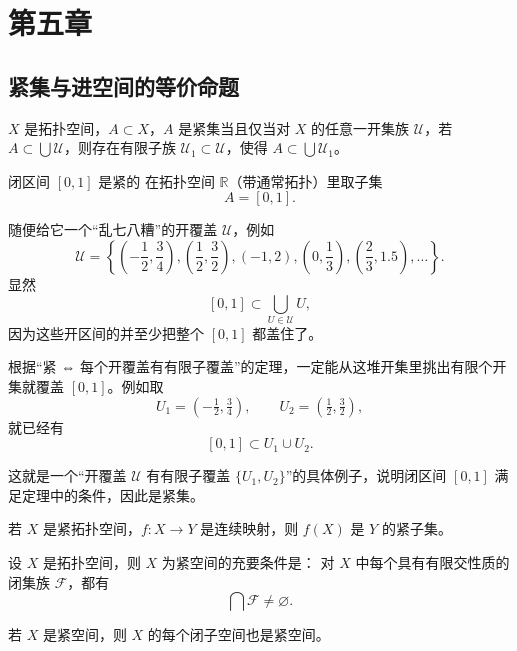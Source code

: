 \chapter{第五章}
\section{紧集与进空间的等价命题}
\begin{theorem}
$X$ 是拓扑空间，$A\subset X$，$A$ 是紧集当且仅当对 $X$ 的任意一开集族 $\mathcal{U}$，若 $A\subset\bigcup\mathcal{U}$，则存在有限子族 $\mathcal{U}_1\subset\mathcal{U}$，使得 $A\subset\bigcup\mathcal{U}_1$。
\end{theorem}
\begin{example}闭区间 $[0,1]$ 是紧的
在拓扑空间 $\mathbb{R}$（带通常拓扑）里取子集
\[
A=[0,1].
\]

随便给它一个“乱七八糟”的开覆盖 $\mathcal U$，例如
\[
\mathcal U=
\left\{
\left(-\frac12,\frac34\right),
\left(\frac12,\frac32\right),
\left(-1,2\right),
\left(0,\frac13\right),
\left(\frac23,1.5\right),
\ldots
\right\}.
\]
显然
\[
[0,1]\subset \bigcup_{U\in\mathcal U} U,
\]
因为这些开区间的并至少把整个 $[0,1]$ 都盖住了。

根据“紧 ⇔ 每个开覆盖有有限子覆盖”的定理，一定能从这堆开集里挑出有限个开集就覆盖 $[0,1]$。例如取
\[
U_1=\left(-\tfrac12,\tfrac34\right),\qquad
U_2=\left(\tfrac12,\tfrac32\right),
\]
就已经有
\[
[0,1]\subset U_1\cup U_2.
\]

这就是一个“开覆盖 $\mathcal U$ 有有限子覆盖 $\{U_1,U_2\}$”的具体例子，说明闭区间 $[0,1]$ 满足定理中的条件，因此是紧集。
\end{example}
\begin{theorem}
若 $X$ 是紧拓扑空间，$f:X\to Y$ 是连续映射，则 $f(X)$ 是 $Y$ 的紧子集。
\end{theorem}
\begin{theorem}
设 $X$ 是拓扑空间，则 $X$ 为紧空间的充要条件是：  
对 $X$ 中每个具有有限交性质的闭集族 $\mathscr{F}$，都有
\[
\bigcap \mathscr{F} \ne \varnothing.
\]
\end{theorem}
\begin{theorem}[闭子空间继承紧]
若 $X$ 是紧空间，则 $X$ 的每个闭子空间也是紧空间。
\end{theorem}
